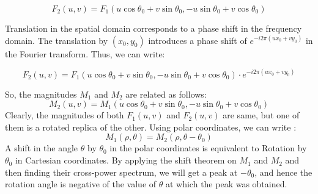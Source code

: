 \documentclass{article}
\begin{document}
\begin{enumerate}
\[
F_2(u, v) = F_1(u \cos \theta_0 + v \sin \theta_0, -u \sin \theta_0 + v \cos \theta_0)
\]

Translation in the spatial domain corresponds to a phase shift in the frequency domain. The translation by \( (x_0, y_0) \) introduces a phase shift of \( e^{-i2\pi(u x_0 + v y_0)} \) in the Fourier transform. Thus, we can write:

\[
F_2(u, v) = F_1(u \cos \theta_0 + v \sin \theta_0, -u \sin \theta_0 + v \cos \theta_0) \cdot e^{-i2\pi(u x_0 + v y_0)}
\]

So, the magnitudes ${M_1}$ and ${M_2}$ are related as follows:
\[
M_2(u, v) = M_1(u \cos \theta_0 + v \sin \theta_0, -u \sin \theta_0 + v \cos \theta_0)
\]
Clearly, the magnitudes of both \( F_1(u, v) \) and \( F_2(u, v) \) are same, but one of them is a rotated replica of the other. Using polar coordinates, we can write :
\[
M_1(\rho, \theta) = M_2(\rho, \theta - \theta_0)
\]
A shift in the angle $\theta$ by $\theta_0$ in the polar coordinates is equivalent to Rotation by $\theta_0$ in Cartesian coordinates. By applying the shift theorem on $M_1$ and $M_2$ and then finding their cross-power spectrum, we will get a peak at $-\theta_0$, and hence the rotation angle is negative of the value of $\theta$ at which the peak was obtained.
\end{enumerate}
\end{document}
